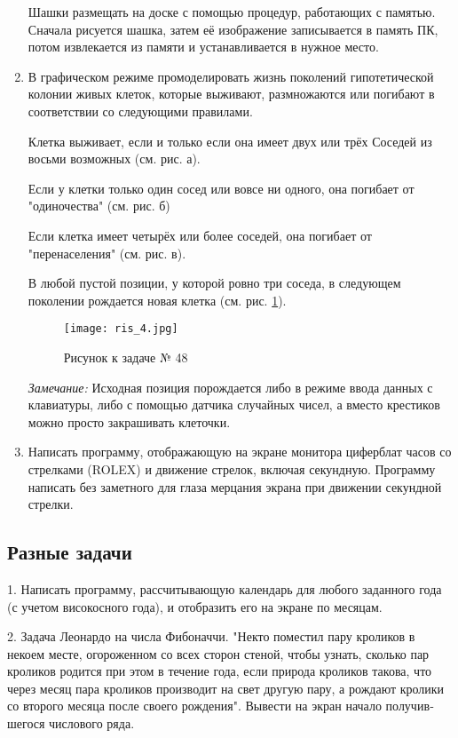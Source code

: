 \begin{enumerate}
Шашки размещать на доске с помощью процедур, работающих с памятью. Сначала рисуется шашка, затем её изображение записывается в память ПК, потом извлекается из памяти и устанав­ливается в нужное место.

\item В графическом режиме промоделировать жизнь поко­лений гипотетической колонии живых клеток, которые выживают, размножаются или погибают в соответствии со следующими прави­лами.

Клетка выживает, если и только если она имеет двух или трёх Соседей из восьми возможных (см. рис. а).
 
Если у клетки только один сосед или вовсе ни одного, она поги­бает от "одиночества" (см. рис. б)

Если клетка имеет четырёх или более соседей, она погибает от "перенаселения" (см. рис. в).

В любой пустой позиции, у которой ровно три соседа, в следу­ющем поколении рождается новая клетка (см. рис. \ref{ris3}).
\begin{figure}[!hb]
\centerline{
\texttt{[image: ris\_4.jpg]}}
\caption{Рисунок к задаче № 48}
\label{ris3}
\end{figure}

{\it Замечание:} Исходная позиция порождается либо в режиме вво­да данных с клавиатуры, либо с помощью датчика случайных чисел, а вместо крестиков можно просто закрашивать клеточки.

 \item Написать программу, отображающую на экране монитора циферблат часов со стрелками (ROLEX) и движение стрелок, включая секундную. Программу написать без заметного для глаза мерцания экрана при движении секундной стрелки.
 
 \end{enumerate}  

\subsection{Разные задачи}

1. Написать программу, рассчитывающую календарь для любого заданного года (с учетом високосного года), и отобразить его на экране по месяцам.

2. Задача Леонардо на числа Фибоначчи. "Некто поместил пару кроликов в некоем месте, огороженном со всех сторон стеной, чтобы узнать, сколько пар кроликов родится при этом в течение года, если природа кроликов такова, что через месяц пара кроликов производит на свет другую пару, а рождают кролики со второго месяца после своего рождения". Вывести на экран начало получив­шегося числового ряда.

